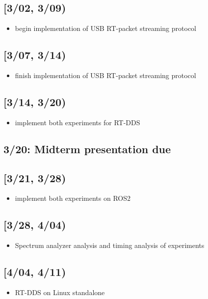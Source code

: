 \documentclass[11pt]{article}
\begin{document}
\subsection{{[}3/02, 3/09)}
\label{sec:org1574ca0}
\begin{itemize}
\item begin implementation of USB RT-packet streaming protocol
\end{itemize}
\subsection{{[}3/07, 3/14)}
\label{sec:org443015a}
\begin{itemize}
\item finish implementation of USB RT-packet streaming protocol
\end{itemize}
\subsection{{[}3/14, 3/20)}
\label{sec:org225c21a}
\begin{itemize}
\item implement both experiments for RT-DDS
\end{itemize}
\subsection{3/20: Midterm presentation due}
\label{sec:orgb416e18}
\subsection{{[}3/21, 3/28)}
\label{sec:orgb09d686}
\begin{itemize}
\item implement both experiments on ROS2
\end{itemize}
\subsection{{[}3/28, 4/04)}
\label{sec:orgf0f0cb8}
\begin{itemize}
\item Spectrum analyzer analysis and timing analysis of experiments
\end{itemize}
\subsection{{[}4/04, 4/11)}
\label{sec:org2532d0b}
\begin{itemize}
\item RT-DDS on Linux standalone
\end{itemize}
\end{document}
